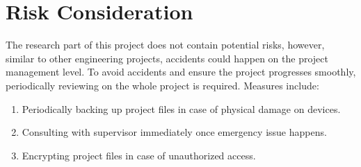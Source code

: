 \chapter{Risk Consideration}
\label{ch:risk}
The research part of this project does not contain potential risks, however, similar to other engineering projects, accidents could happen on the project management level. To avoid accidents and ensure the project progresses smoothly, periodically reviewing on the whole project is required. Measures include:
\begin{enumerate}
    \item Periodically backing up project files in case of physical damage on devices. 
    \item Consulting with supervisor immediately once emergency issue happens.
    \item Encrypting project files in case of unauthorized access.
\end{enumerate}